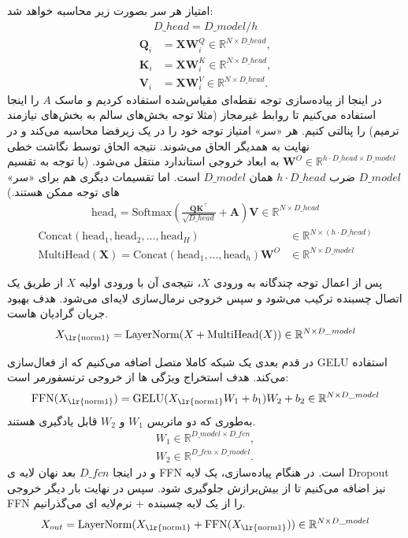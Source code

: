 امتیاز هر سر بصورت زیر محاسبه خواهد شد:
\begin{align*}
	D\_{head} = D\_{model} / h
\end{align*}
\begin{align*}
	\mathbf{Q}_i &= \mathbf{X} \mathbf{W}_i^Q \in \mathbb{R}^{N \times D\_{head}}, \\
	\mathbf{K}_i &= \mathbf{X} \mathbf{W}_i^K \in \mathbb{R}^{N \times D\_{head}}, \\
	\mathbf{V}_i &= \mathbf{X} \mathbf{W}_i^V \in \mathbb{R}^{N \times D\_{head}}.
\end{align*}
در اینجا از پیاده‌سازی توجه نقطه‌ای مقیاس‌شده استفاده کردیم  و ماسک $A$ را اینجا استفاده می‌کنیم تا روابط غیرمجاز (مثلا توجه بخش‌های سالم به بخش‌های نیازمند ترمیم) را پنالتی کنیم. هر «سر» امتیاز توجه خود را در یک زیرفضا محاسبه می‌کند و در نهایت به همدیگر الحاق می‌شوند. نتیجه الحاق توسط نگاشت خطی 
$\mathbf{W}^O\in  \mathbb{R}^{h \cdot D\_{head} \times D\_{model}}$ 
به ابعاد خروجی استاندارد منتقل می‌شود. (با توجه به تقسیم 
$D\_{model}$ ضرب $h \cdot D\_{head}$
همان $D\_{model}$ است. اما تقسیمات دیگری هم برای «سر» های توجه ممکن هستند.)
\begin{align}
	\text{head}_{i} =
	\text{Softmax}\left(\frac{\mathbf{Q} \mathbf{K}^\top}{\sqrt{D\_{head}}} + \mathbf{A} \right) \mathbf{V} \in \mathbb{R}^{N \times D\_{head}}
\end{align}
\begin{align*}
	  \text{Concat}(\text{head}_1, \text{head}_2, \dots, \text{head}_H) & \in \mathbb{R}^{N \times (h \cdot D\_{head})} \\
	\text{MultiHead}(\mathbf{X}) = \text{Concat}(\text{head}_1, \dots, \text{head}_h)\mathbf{W}^O & \in \mathbb{R}^{N \times D\_{model}}
\end{align*}

پس از اعمال توجه چندگانه به ورودی $X$، نتیجه‌ی آن با ورودی اولیه $X$ از طریق یک اتصال چسبنده ترکیب می‌شود و سپس خروجی نرمال‌سازی لایه‌ای می‌شود. هدف بهبود جریان گرادیان هاست. 
$$
X_{\text{\lr{norm1}}} = \text{LayerNorm}(X + \text{MultiHead}(X)) \in \mathbb{R}^{N \times D\_{model}}
$$

در قدم بعدی یک شبکه کاملا متصل اضافه می‌کنیم که از فعال‌سازی GELU استفاده می‌کند. هدف استخراج ویژگی ها از خروجی ترنسفورمر است:
$$
\text{FFN}(X_{\text{\lr{norm1}}}) = \text{GELU}(X_{\text{\lr{norm1}}} W_1 + b_1) W_2 + b_2 \in \mathbb{R}^{N \times D\_{model}}
$$
به‌طوری که دو ماتریس $W_1 $ و $W_2 $ قابل یادگیری هستند.
\begin{align*}
W_1 \in \mathbb{R}^{D\_{model} \times D\_{fcn}},\\
W_2 \in \mathbb{R}^{D\_{fcn} \times D\_{model}}.
\end{align*}
و در اینجا $D\_{fcn}$ بعد نهان لایه ی FFN است.  در هنگام پیاده‌سازی، یک لایه Dropout نیز اضافه می‌کنیم تا از بیش‌برازش جلوگیری شود. سپس در نهایت بار دیگر خروجی FFN را از یک لایه چسبنده +‌ نرم‌لایه ای می‌گذرانیم.
$$
X_{out} = \text{LayerNorm}(X_{\text{\lr{norm1}}} + \text{FFN}(X_{\text{\lr{norm1}}})) \in \mathbb{R}^{N \times D\_{model}}
$$


